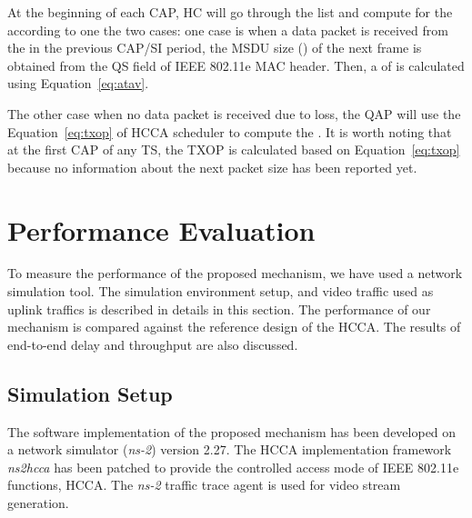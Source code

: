 \documentclass[a4paper, conference]{IEEEtran}
\begin{document}
At the beginning of each CAP, HC will go through the  list and compute  for the  according to one the two cases: one case is when a data packet is received from the  in the previous CAP/SI period, the MSDU size () of the next frame is obtained from the QS field of IEEE 802.11e MAC header. Then, a  of  is calculated using Equation~\eqref{eq:atav}. 

The other case when no data packet is received due to loss, the QAP will use the Equation~\eqref{eq:txop} of  HCCA scheduler to compute the . It is worth noting that at the first CAP of any TS, the TXOP is calculated based on Equation~\eqref{eq:txop} because no information about the next packet size has been reported yet.

\section{Performance Evaluation}
\label{sec:evaluation}
To measure the performance of the proposed mechanism, we have used a network simulation tool. The simulation environment setup, and video traffic used as uplink traffics is described in details in this section. The performance of our mechanism is compared against the reference design of the HCCA. The results of end-to-end delay and throughput are also discussed.
\subsection{Simulation Setup}
The software implementation of the proposed mechanism has been developed on a network simulator (\textit{ns-2}) \cite{NS2} version 2.27. The HCCA implementation framework \textit{ns2hcca} \cite{cicconetti2005} has been patched to provide the controlled access mode of IEEE 802.11e functions, HCCA. The \textit{ns-2} traffic trace agent is used for video stream generation.
\end{document}
